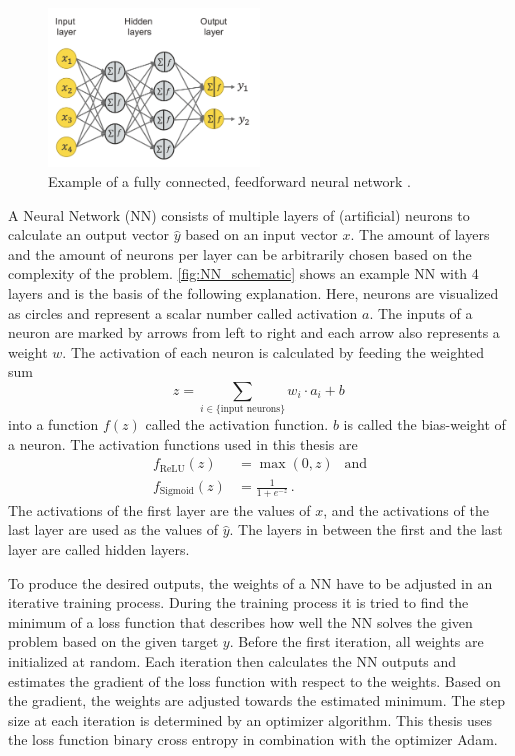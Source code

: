 \begin{figure}
    \centering
    \includegraphics[width=0.5\textwidth]{images/NN_schematic.png}
    \caption{Example of a fully connected, feedforward neural network \cite{NN_schematic}.}
    \label{fig:NN_schematic}
\end{figure}

A Neural Network (NN) consists of multiple layers of (artificial) neurons to calculate an output vector $\hat{y}$ based on an input vector $x$.
The amount of layers and the amount of neurons per layer can be arbitrarily chosen based on the complexity of the problem.
\autoref{fig:NN_schematic} shows an example NN with 4 layers and is the basis of the following explanation.
Here, neurons are visualized as circles and represent a scalar number called activation $a$. 
The inputs of a neuron are marked by arrows from left to right and each arrow also represents a weight $w$.
The activation of each neuron is calculated by feeding the weighted sum 
\begin{equation*}
    z = \sum_{i \in \{\text{input neurons}\}} w_i \cdot a_i + b \, 
\end{equation*}
into a function $f(z)$ called the activation function.
$b$ is called the bias-weight of a neuron.
The activation functions used in this thesis are 
\begin{align*}
    f_\text{ReLU}(z) &= \max(0, z) \:\:\text{  and} \\
    f_\text{Sigmoid}(z) &= \frac{1}{1+e^{-z}} \, .
\end{align*}
The activations of the first layer are the values of $x$, and the activations of the last layer are used as the values of $\hat{y}$.
The layers in between the first and the last layer are called hidden layers.

To produce the desired outputs, the weights of a NN have to be adjusted in an iterative training process.
During the training process it is tried to find the minimum of a loss function that describes how well the NN solves the given problem based on the given target $y$.
Before the first iteration, all weights are initialized at random.
Each iteration then calculates the NN outputs and estimates the gradient of the loss function with respect to the weights.
Based on the gradient, the weights are adjusted towards the estimated minimum.
The step size at each iteration is determined by an optimizer algorithm.
This thesis uses the loss function binary cross entropy in combination with the optimizer Adam.

